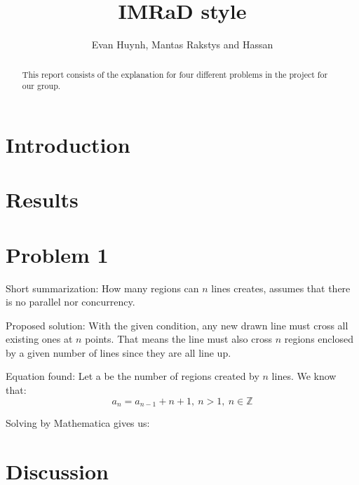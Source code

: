 \documentclass[11pt,a4paper]{article}
\begin{document}
\title{IMRaD style}
\author{Evan Huynh, Mantas Rakstys and Hassan}

\maketitle

\begin{abstract}
 This report consists of the explanation for four different problems in the project for our group.
\end{abstract}

\tableofcontents

\section{Introduction}

\section{Results}
\section{Problem 1}
Short summarization: How many regions can \(n\) lines creates, assumes that there is no parallel nor concurrency.

Proposed solution: With the given condition, any new drawn line must cross all existing ones at \(n\) points. That means the line must also cross \(n\) regions enclosed by a given number of lines since they are all line up. 

Equation found: Let a be the number of regions created by \(n\) lines. We know that:
\[a_{n} = a_{n-1} + n + 1, \ n>1, \ n \in \mathds{Z} \]

Solving by Mathematica gives us: 
\

\section{Discussion}

\begin{thebibliography}{99}
 
\end{thebibliography}
\end{document}
